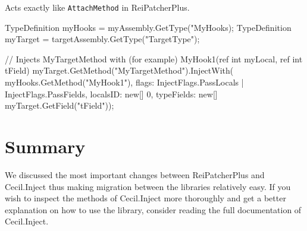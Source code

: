 \documentclass[a4paper,11pt]{article}
\newcommand{\CecilInject}{\textsc{C}{\scriptsize \sc ecil}.\textsc{I}{\scriptsize \sc nject}}
\begin{document}
\begin{mdef}
Acts exactly like \texttt{AttachMethod} in ReiPatcherPlus.

\begin{cs}
TypeDefinition myHooks = myAssembly.GetType("MyHooks);
TypeDefinition myTarget = targetAssembly.GetType("TargetType");

// Injects MyTargetMethod with (for example) MyHook1(ref int myLocal, ref int tField)
myTarget.GetMethod("MyTargetMethod").InjectWith(
                   myHooks.GetMethod("MyHook1"),
                   flags: InjectFlags.PassLocals
                        | InjectFlags.PassFields,
                   localsID: new[] {0},
                   typeFields: new[] {myTarget.GetField("tField")});
\end{cs}
\end{mdef}

\section{Summary}
We discussed the most important changes between ReiPatcherPlus and \CecilInject{} thus making migration between the libraries relatively easy. If you wish to inspect the methods of \CecilInject{} more thoroughly and get a better explanation on how to use the library, consider reading the full documentation of \CecilInject{}.
\end{document}
